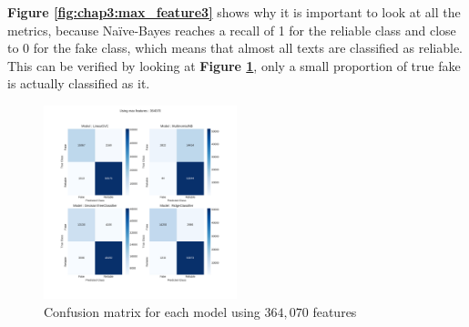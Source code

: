 \textbf{Figure \ref{fig:chap3:max_feature3}} shows why it is important to look at all the metrics, because Na\"{i}ve-Bayes reaches a recall of 1 for the reliable class and close to 0 for the fake class, which means that almost all texts are classified as reliable. This can be verified by looking at \textbf{Figure \ref{fig:chap3:confMat1}}, only a small proportion of true fake is actually classified as it.
\begin{figure}
 \centering
 \includegraphics[width=0.5\textwidth]{images/chapitre3/confMat_fake_364070}
 \caption{Confusion matrix for each model using $364,070$ features}
 \label{fig:chap3:confMat1}
\end{figure}
